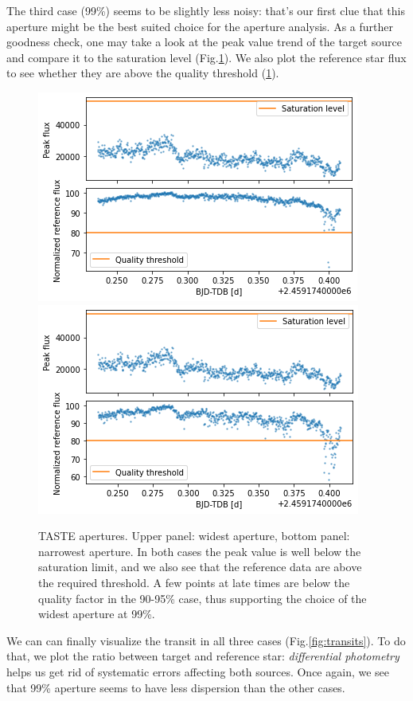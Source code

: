 \documentclass{aa}
\begin{document}
The third case (99\%) seems to be slightly less noisy: that's our first clue that this aperture might be the best suited choice for the aperture analysis.
As a further goodness check, one may take a look at the peak value trend of the target source and compare it to the saturation level
(Fig.\ref{fig:saturation-quality}). We also plot the reference star flux to see whether they are above the quality threshold (\ref{fig:saturation-quality}).
\begin{figure}[h]
    \centering  
    \includegraphics[scale=0.5, angle=0]{pictures/saturation-quality.png}
    \includegraphics[scale=0.5, angle=0]{pictures/saturation-quality2.png}
    \caption{TASTE apertures. Upper panel: widest aperture, bottom panel: narrowest aperture. In both cases the peak value is well below the saturation limit, and we also see that the reference data are above the required threshold. A few points at late times are below the quality factor in the 90-95\% case, thus supporting the choice of the widest aperture at 99\%.}
    \label{fig:saturation-quality}
\end{figure}
We can can finally visualize the transit in all three cases (Fig.\ref{fig:transits}). To do that, we plot the ratio between target and reference star: \textit{differential photometry} helps us get rid of systematic errors affecting both sources. Once again, we see that 99\% aperture seems to have less dispersion than the other cases.
\end{document}
